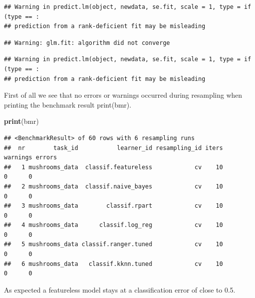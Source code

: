 \documentclass[
]{article}
\newenvironment{Shaded}{\begin{snugshade}}{\end{snugshade}}
\newcommand{\CommentTok}[1]{\textcolor[rgb]{0.56,0.35,0.01}{\textit{#1}}}
\newcommand{\KeywordTok}[1]{\textcolor[rgb]{0.13,0.29,0.53}{\textbf{#1}}}
\newcommand{\NormalTok}[1]{#1}
\newcommand{\OperatorTok}[1]{\textcolor[rgb]{0.81,0.36,0.00}{\textbf{#1}}}
\newcommand{\StringTok}[1]{\textcolor[rgb]{0.31,0.60,0.02}{#1}}
\begin{document}
\begin{verbatim}
## Warning in predict.lm(object, newdata, se.fit, scale = 1, type = if (type == :
## prediction from a rank-deficient fit may be misleading
\end{verbatim}

\begin{verbatim}
## Warning: glm.fit: algorithm did not converge
\end{verbatim}

\begin{verbatim}
## Warning in predict.lm(object, newdata, se.fit, scale = 1, type = if (type == :
## prediction from a rank-deficient fit may be misleading
\end{verbatim}

\begin{Shaded}
\end{Shaded}

First of all we see that no errors or warnings occurred during
resampling when printing the benchmark result print(bmr).

\begin{Shaded}
\begin{Highlighting}[]
\KeywordTok{print}\NormalTok{(bmr)}
\end{Highlighting}
\end{Shaded}

\begin{verbatim}
## <BenchmarkResult> of 60 rows with 6 resampling runs
##  nr        task_id           learner_id resampling_id iters warnings errors
##   1 mushrooms_data  classif.featureless            cv    10        0      0
##   2 mushrooms_data  classif.naive_bayes            cv    10        0      0
##   3 mushrooms_data        classif.rpart            cv    10        0      0
##   4 mushrooms_data      classif.log_reg            cv    10        0      0
##   5 mushrooms_data classif.ranger.tuned            cv    10        0      0
##   6 mushrooms_data   classif.kknn.tuned            cv    10        0      0
\end{verbatim}

As expected a featureless model stays at a classification error of close
to 0.5.
\end{document}
